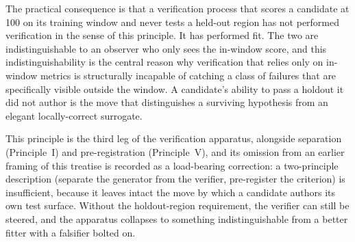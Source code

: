 \documentclass[11pt]{article}
\begin{document}
The practical consequence is that a verification process that scores a candidate at 100 on its training window and never tests a held-out region has not performed verification in the sense of this principle. It has performed fit. The two are indistinguishable to an observer who only sees the in-window score, and this indistinguishability is the central reason why verification that relies only on in-window metrics is structurally incapable of catching a class of failures that are specifically visible outside the window. A candidate's ability to pass a holdout it did not author is the move that distinguishes a surviving hypothesis from an elegant locally-correct surrogate.

This principle is the third leg of the verification apparatus, alongside separation (Principle~I) and pre-registration (Principle~V), and its omission from an earlier framing of this treatise is recorded as a load-bearing correction: a two-principle description (separate the generator from the verifier, pre-register the criterion) is insufficient, because it leaves intact the move by which a candidate authors its own test surface. Without the holdout-region requirement, the verifier can still be steered, and the apparatus collapses to something indistinguishable from a better fitter with a falsifier bolted on.
\end{document}
